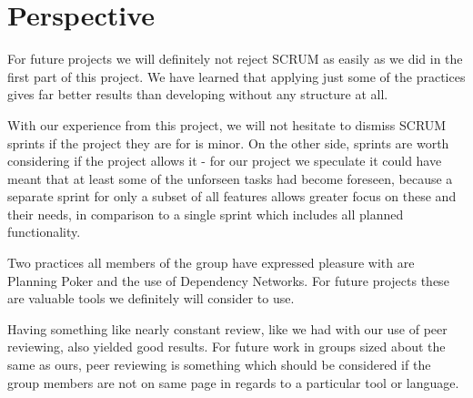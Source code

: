 \section{Perspective}
For future projects we will definitely not reject SCRUM as easily as we did in the first part of this project. We have learned that applying just some of the practices gives far better results than developing without any structure at all.

With our experience from this project, we will not hesitate to dismiss SCRUM sprints if the project they are for is minor. On the other side, sprints are worth considering if the project allows it - for our project we speculate it could have meant that at least some of the unforseen tasks had become foreseen, because a separate sprint for only a subset of all features allows greater focus on these and their needs, in comparison to a single sprint which includes all planned functionality.

Two practices all members of the group have expressed pleasure with are Planning Poker and the use of Dependency Networks. For future projects these are valuable tools we definitely will consider to use.

Having something like nearly constant review, like we had with our use of peer reviewing, also yielded good results. For future work in groups sized about the same as ours, peer reviewing is something which should be considered if the group members are not on same page in regards to a particular tool or language.

\newpage